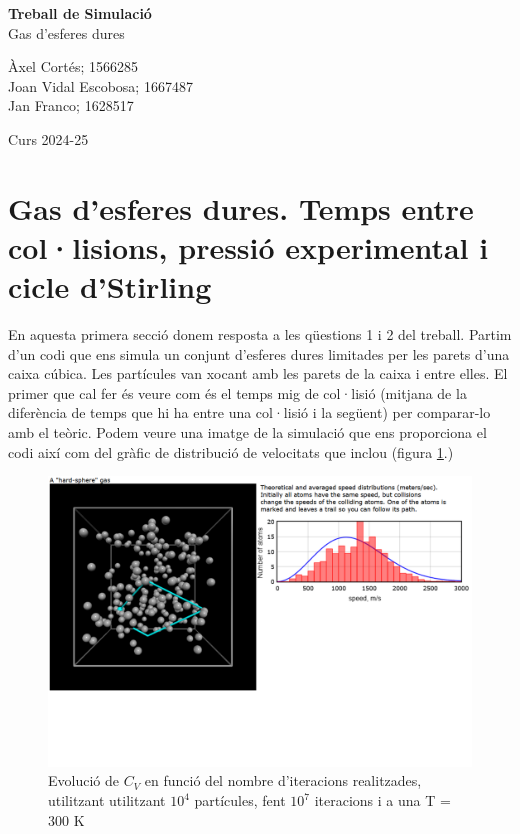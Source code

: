 \documentclass{article}
\begin{document}
	
	\begin{titlepage}
		\begin{center}
			\vspace*{1cm}
			
			\Huge
			\textbf{Treball de Simulació} \\
			Gas d'esferes dures
			
			\vspace{0.5cm}
			
			
			
			
			\vspace{1.5cm}
			\Large
			Àxel Cortés; 1566285 \\
			Joan Vidal Escobosa; 1667487 \\
			Jan Franco; 1628517 \\ 
			
			
			\vfill
			\LARGE
			
			\vspace{0.8cm}
			
			\Large
			Curs 2024-25 
		\end{center} 
	\end{titlepage}
	
	\setcounter{page}{1}
	
	
	\section{Gas d'esferes dures. Temps entre col·lisions, pressió experimental i cicle d'Stirling}
	
	
	En aquesta primera secció donem resposta a les qüestions 1 i 2 del treball. Partim d'un codi que ens simula un conjunt d'esferes dures limitades per les parets d'una caixa cúbica. Les partícules van xocant amb les parets de la caixa i entre elles. El primer que cal fer és veure com és el temps mig de col·lisió (mitjana de la diferència de temps que hi ha entre una col·lisió i la següent) per comparar-lo amb el teòric. Podem veure una imatge de la simulació que ens proporciona el codi així com del gràfic de distribució de velocitats que inclou (figura \ref{gugugu}.) \\
	
	
	\begin{figure}[h!]
		\centering
		\includegraphics[width=0.7\linewidth]{Interfaç.png}
		\caption{Evolució de $C_V$ en funció del nombre d'iteracions realitzades, utilitzant utilitzant $10^4$ partícules, fent $10^7$ iteracions i a una T = 300 K}
		\label{gugugu}
	\end{figure}
	
\end{document}

